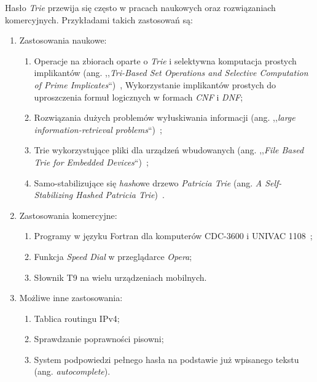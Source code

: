         Hasło \emph{Trie} przewija się często w pracach naukowych oraz rozwiązaniach komercyjnych. Przykładami takich zastosowań są:
        \begin{enumerate}
            \item Zastosowania naukowe:
            \begin{enumerate}
                \item Operacje na zbiorach oparte o \emph{Trie} i selektywna komputacja prostych implikantów (ang. ,,\emph{Tri-Based Set Operations and Selective Computation of Prime Implicates}``)~\cite{TriBasedSetOperationsAndSelectiveComputationsOfPrimeImplicates},
                    \subitem Wykorzystanie implikantów prostych do uproszczenia formuł logicznych w formach \emph{CNF} i \emph{DNF};
                \item Rozwiązania dużych problemów wyłuskiwania informacji (ang. ,,\emph{large information-retrieval problems}``)~\cite{PatriciaDonaldRMorrison};
                \item Trie wykorzystujące pliki dla urządzeń wbudowanych (ang. ,,\emph{File Based Trie for Embedded Devices}``)~\cite{FileBasedTrieForEmbeddedDevices};
                \item Samo-stabilizujące się \emph{hash}owe drzewo \emph{Patricia Trie} (ang. \emph{A Self-Stabilizing Hashed Patricia Trie})~\cite{knollmann2018selfstabilizing}.
            \end{enumerate}
            \item Zastosowania komercyjne:
            \begin{enumerate}
                \item Programy w języku Fortran dla komputerów CDC-3600 i UNIVAC 1108~\cite{PatriciaDonaldRMorrison};
                \item Funkcja \emph{Speed Dial} w przeglądarce \emph{Opera};
                \item Słownik T9 na wielu urządzeniach mobilnych.
            \end{enumerate}
            \item Możliwe inne zastosowania:
            \begin{enumerate}
                \item Tablica routingu IPv4;
                \item Sprawdzanie poprawności pisowni;
                \item System podpowiedzi pełnego hasła na podstawie już wpisanego tekstu (ang. \emph{autocomplete}).
            \end{enumerate}
        \end{enumerate}

